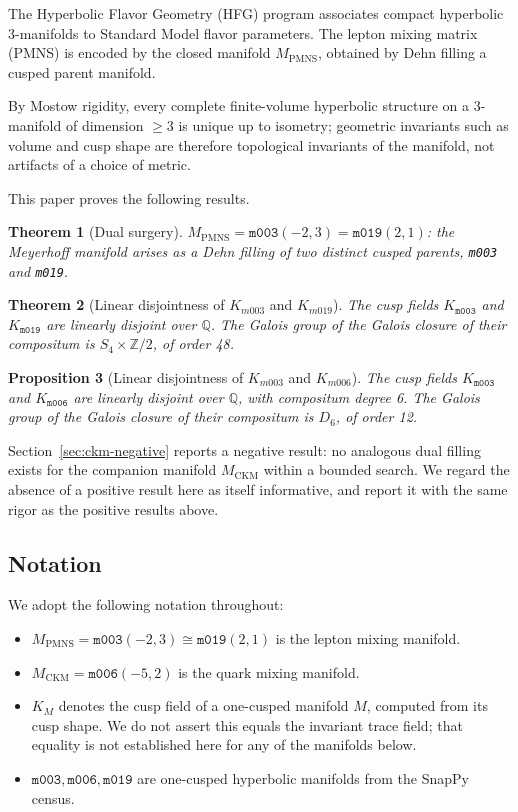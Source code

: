 \documentclass[11pt,a4paper]{article}
\newtheorem{theorem}{Theorem}
\newtheorem{proposition}[theorem]{Proposition}
\theoremstyle{definition}
\theoremstyle{remark}
\newcommand{\Z}{\mathbb{Z}}
\newcommand{\Q}{\mathbb{Q}}
\newcommand{\mfld}[1]{\texttt{#1}}
\begin{document}
The Hyperbolic Flavor Geometry (HFG) program associates compact
hyperbolic 3-manifolds to Standard Model flavor parameters. The
lepton mixing matrix (PMNS) is encoded by the closed manifold
$M_{\mathrm{PMNS}}$, obtained by Dehn filling a cusped parent
manifold.

By Mostow rigidity, every complete finite-volume hyperbolic
structure on a 3-manifold of dimension $\ge 3$ is unique up to
isometry; geometric invariants such as volume and cusp shape are
therefore topological invariants of the manifold, not artifacts of
a choice of metric.

This paper proves the following results.

\begin{theorem}[Dual surgery]\label{thm:dual}
$M_{\mathrm{PMNS}} = \mfld{m003}(-2,3) = \mfld{m019}(2,1)$: the
Meyerhoff manifold arises as a Dehn filling of two distinct cusped
parents, \mfld{m003} and \mfld{m019}.
\end{theorem}

\begin{theorem}[Linear disjointness of $K_{m003}$ and $K_{m019}$]\label{thm:disjoint}
The cusp fields $K_{\mfld{m003}}$ and $K_{\mfld{m019}}$ are linearly
disjoint over $\Q$. The Galois group of the Galois closure of their
compositum is $S_4\times\Z/2$, of order 48.
\end{theorem}

\begin{proposition}[Linear disjointness of $K_{m003}$ and $K_{m006}$]\label{prop:d6}
The cusp fields $K_{\mfld{m003}}$ and $K_{\mfld{m006}}$ are linearly
disjoint over $\Q$, with compositum degree 6. The Galois group of
the Galois closure of their compositum is $D_6$, of order 12.
\end{proposition}

Section~\ref{sec:ckm-negative} reports a negative result: no
analogous dual filling exists for the companion manifold
$M_{\mathrm{CKM}}$ within a bounded search. We regard the absence
of a positive result here as itself informative, and report it
with the same rigor as the positive results above.

\subsection*{Notation}

We adopt the following notation throughout:
\begin{itemize}
\item $M_{\mathrm{PMNS}} = \mfld{m003}(-2,3) \cong \mfld{m019}(2,1)$
      is the lepton mixing manifold.
\item $M_{\mathrm{CKM}} = \mfld{m006}(-5,2)$ is the quark mixing
      manifold.
\item $K_M$ denotes the cusp field of a one-cusped manifold $M$,
      computed from its cusp shape. We do not assert this equals
      the invariant trace field; that equality is not established
      here for any of the manifolds below.
\item $\mfld{m003}, \mfld{m006}, \mfld{m019}$ are one-cusped
      hyperbolic manifolds from the SnapPy census.
\end{itemize}
\end{document}
